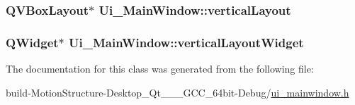 \hypertarget{class_ui___main_window_aecd96a04789fcfec3f98d80390ad8184}{
\subsubsection[{vertical\-Layout}]{\setlength{\rightskip}{0pt plus 5cm}Q\-V\-Box\-Layout$\ast$ Ui\-\_\-\-Main\-Window\-::vertical\-Layout}}\label{class_ui___main_window_aecd96a04789fcfec3f98d80390ad8184}
\hypertarget{class_ui___main_window_a805d415fff07a22a85219e1f22f2da28}{
\subsubsection[{vertical\-Layout\-Widget}]{\setlength{\rightskip}{0pt plus 5cm}Q\-Widget$\ast$ Ui\-\_\-\-Main\-Window\-::vertical\-Layout\-Widget}}\label{class_ui___main_window_a805d415fff07a22a85219e1f22f2da28}


The documentation for this class was generated from the following file\-:\begin{DoxyCompactItemize}
\item 
build-\/\-Motion\-Structure-\/\-Desktop\-\_\-\-Qt\-\_\-\_\-\_\-\-G\-C\-C\-\_\-64bit-\/\-Debug/\hyperlink{ui__mainwindow_8h}{ui\-\_\-mainwindow.\-h}\end{DoxyCompactItemize}
